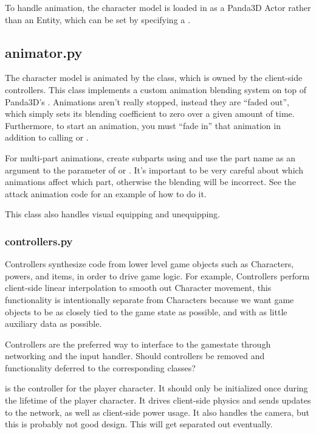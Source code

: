 \documentclass{article}
\begin{document}
To handle animation, the character model is loaded in as a Panda3D Actor rather than an Entity,
which can be set by specifying a .
\subsection{animator.py}
The character model is animated by the  class, which is owned by the client-side
controllers. This class implements a custom animation blending system on top of Panda3D's
. Animations aren't really stopped, instead they are ``faded
out'', which simply sets its blending coefficient to zero over a given amount of time.
Furthermore, to start an animation, you must ``fade in'' that animation in addition to calling
 or .

For multi-part animations, create subparts using  and use the
part name as an argument to the  parameter of  or
. It's important to be very careful about which animations affect
which part, otherwise the blending will be incorrect. See the attack animation code for
an example of how to do it.

This class also handles visual equipping and unequipping.

\subsubsection{controllers.py}
Controllers synthesize code from lower level game objects such as Characters, powers, and items,
in order to drive game logic. For example, Controllers
perform client-side linear interpolation to smooth out Character movement, this functionality is
intentionally separate from Characters because we want game objects to be as closely tied to the
game state as possible, and with as little auxiliary data as possible.

Controllers are the preferred way to interface to the gamestate through networking and the input handler.
Should controllers be removed and functionality deferred to the corresponding classes?

 is the controller for the player character. It should only be initialized
once during the lifetime of the player character. It drives client-side physics and sends updates
to the network, as well as client-side power usage. It also handles the camera, but this is
probably not good design. This will get separated out eventually.
\end{document}
